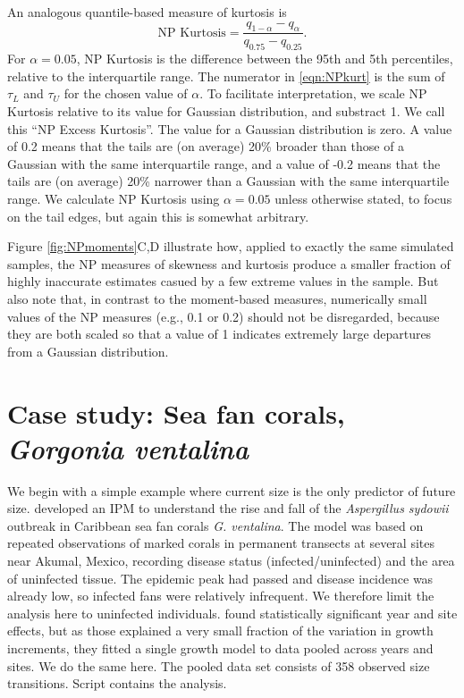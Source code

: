 \documentclass[11pt]{article}
\newcounter{box}
\newcommand{\be}{\begin{equation}}
\newcommand{\ee}{\end{equation}}
\begin{document}
{An analogous quantile-based measure of kurtosis \citep{jones-etal-1994} is 
\be
\mbox{NP Kurtosis}  = \frac{q_{1-\alpha} - q_{\alpha}}{q_{0.75} - q_{0.25}}.
\label{eqn:NPkurt}
\ee
For $\alpha=0.05$, NP Kurtosis is the difference between the 95th and 5th percentiles, relative to the interquartile range. 
The numerator in \eqref{eqn:NPkurt} is the sum of $\tau_L$ and $\tau_U$ for the chosen value of $\alpha$. 
To facilitate interpretation, we scale NP Kurtosis relative to its value for Gaussian distribution, and substract 1. 
We call this ``NP Excess Kurtosis''. The value for a Gaussian distribution is zero. A value of 0.2 means that the tails
are (on average) 20\% broader than those of a Gaussian with the same interquartile range, and a value of -0.2 means that the tails
are (on average) 20\% narrower than a Gaussian with the same interquartile range. We calculate NP Kurtosis using $\alpha=0.05$ 
unless otherwise stated, to focus on the tail edges, but again this is somewhat arbitrary. 

Figure \ref{fig:NPmoments}C,D illustrate how, applied to exactly the same simulated samples, the NP measures of skewness and
kurtosis produce a smaller fraction of highly inaccurate estimates casued by a few extreme values in the sample. But also note
that, in contrast to the moment-based measures, numerically small values of the NP measures (e.g., 0.1 or 0.2) should not be
disregarded, because they are both scaled so that a value of 1 indicates extremely large departures from a Gaussian distribution. 

\section{Case study: Sea fan corals, \emph{Gorgonia ventalina}}
We begin with a simple example where current size is the only predictor of future size. \cite{bruno-etal-2011} developed
an IPM to understand the rise and fall of the \emph{Aspergillus sydowii} outbreak in Caribbean sea fan corals 
\emph{G. ventalina}. The model was based on repeated observations of marked corals in permanent transects at several sites 
near Akumal, Mexico, recording disease status (infected/uninfected) and the area of uninfected tissue. 
The epidemic peak had passed and disease incidence was already low, so infected fans were relatively infrequent. 
We therefore limit the analysis here to uninfected individuals. \citet{bruno-et-al-2011} found statistically significant year
and site effects, but as those explained a very small fraction of the variation in growth increments, they fitted a single growth
model to data pooled across years and sites. We do the same here. The pooled data set consists of 358 observed
size transitions. Script  contains the analysis. 

}
\end{document}
